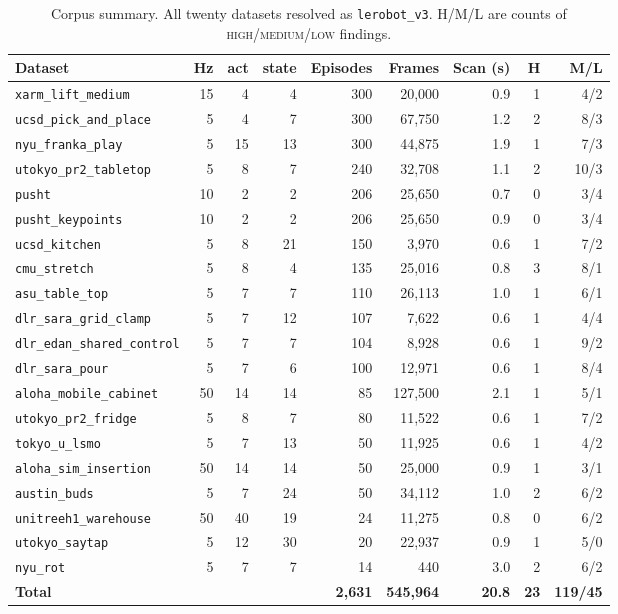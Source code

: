 \documentclass[10pt,a4paper]{article}
\begin{document}
\begin{table}[tb]
\centering
\caption{Corpus summary. All twenty datasets resolved as \texttt{lerobot\_v3}.
H/M/L are counts of \textsc{high}/\textsc{medium}/\textsc{low} findings.}
\label{tab:corpus}
\small
\begin{tabular}{lrrrrrrrr}
\toprule
Dataset & Hz & act & state & Episodes & Frames & Scan (s) & H & M/L \\
\midrule
\texttt{xarm\_lift\_medium}         & 15 &  4 &  4 & 300 & 20{,}000  & 0.9 & 1 & 4/2 \\
\texttt{ucsd\_pick\_and\_place}     &  5 &  4 &  7 & 300 & 67{,}750  & 1.2 & 2 & 8/3 \\
\texttt{nyu\_franka\_play}          &  5 & 15 & 13 & 300 & 44{,}875  & 1.9 & 1 & 7/3 \\
\texttt{utokyo\_pr2\_tabletop}      &  5 &  8 &  7 & 240 & 32{,}708  & 1.1 & 2 & 10/3 \\
\texttt{pusht}                      & 10 &  2 &  2 & 206 & 25{,}650  & 0.7 & 0 & 3/4 \\
\texttt{pusht\_keypoints}           & 10 &  2 &  2 & 206 & 25{,}650  & 0.9 & 0 & 3/4 \\
\texttt{ucsd\_kitchen}              &  5 &  8 & 21 & 150 & 3{,}970   & 0.6 & 1 & 7/2 \\
\texttt{cmu\_stretch}               &  5 &  8 &  4 & 135 & 25{,}016  & 0.8 & 3 & 8/1 \\
\texttt{asu\_table\_top}            &  5 &  7 &  7 & 110 & 26{,}113  & 1.0 & 1 & 6/1 \\
\texttt{dlr\_sara\_grid\_clamp}     &  5 &  7 & 12 & 107 & 7{,}622   & 0.6 & 1 & 4/4 \\
\texttt{dlr\_edan\_shared\_control} &  5 &  7 &  7 & 104 & 8{,}928   & 0.6 & 1 & 9/2 \\
\texttt{dlr\_sara\_pour}            &  5 &  7 &  6 & 100 & 12{,}971  & 0.6 & 1 & 8/4 \\
\texttt{aloha\_mobile\_cabinet}     & 50 & 14 & 14 &  85 & 127{,}500 & 2.1 & 1 & 5/1 \\
\texttt{utokyo\_pr2\_fridge}        &  5 &  8 &  7 &  80 & 11{,}522  & 0.6 & 1 & 7/2 \\
\texttt{tokyo\_u\_lsmo}             &  5 &  7 & 13 &  50 & 11{,}925  & 0.6 & 1 & 4/2 \\
\texttt{aloha\_sim\_insertion}      & 50 & 14 & 14 &  50 & 25{,}000  & 0.9 & 1 & 3/1 \\
\texttt{austin\_buds}               &  5 &  7 & 24 &  50 & 34{,}112  & 1.0 & 2 & 6/2 \\
\texttt{unitreeh1\_warehouse}       & 50 & 40 & 19 &  24 & 11{,}275  & 0.8 & 0 & 6/2 \\
\texttt{utokyo\_saytap}             &  5 & 12 & 30 &  20 & 22{,}937  & 0.9 & 1 & 5/0 \\
\texttt{nyu\_rot}                   &  5 &  7 &  7 &  14 & 440       & 3.0 & 2 & 6/2 \\
\midrule
\textbf{Total} & & & & \textbf{2{,}631} & \textbf{545{,}964} & \textbf{20.8} & \textbf{23} & \textbf{119/45} \\
\bottomrule
\end{tabular}
\end{table}
\end{document}
